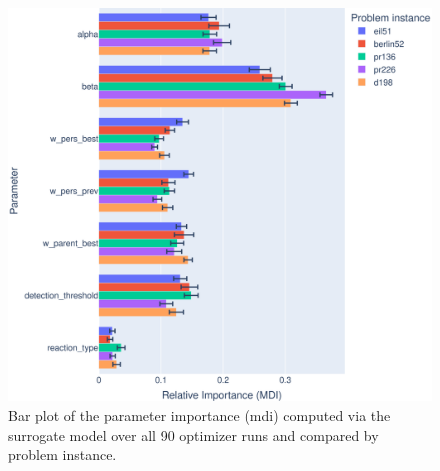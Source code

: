 \begin{figure}[h]
	\centering
	\includegraphics[width=1\textwidth]{results/part2/parameter_importance_bar_problem.svg}
	\caption[Bar plot of the parameter importance compared by problem instance]{Bar plot of the parameter importance (\gls{mdi}) computed via the surrogate model over all 90 optimizer runs and compared by problem instance.}
	\label{fig:parameter_importance_bar_problem}
\end{figure}


